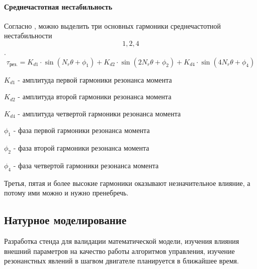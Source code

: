 
\paragraph{ Среднечастотная нестабильность }
Согласно \cite[ф-ла 5]{Novel_Modeling_and_Damping}, можно выделить три основных
гармоники среднечастотной нестабильности \[1, 2, 4\].
\begin{equation}
    \tau_{\text{рез.}} =   K_{d1} \cdot \sin{ (  N_{r} \theta + \phi_{1}) }
                         + K_{d2} \cdot \sin{ (2 N_{r} \theta + \phi_{2}) }
                         + K_{d4} \cdot \sin{ (4 N_{r} \theta + \phi_{4}) }
\end{equation}

$K_{d1}$ - амплитуда первой гармоники резонанса момента

$K_{d2}$ - амплитуда второй гармоники резонанса момента

$K_{d4}$ - амплитуда четвертой гармоники резонанса момента

$\phi_{1}$ - фаза первой гармоники резонанса момента

$\phi_{2}$ - фаза второй гармоники резонанса момента

$\phi_{4}$ - фаза четвертой гармоники резонанса момента

Третья, пятая и более высокие гармоники оказывают незначительное влияние, а потому
ими можно и нужно пренебречь.

\newpage
\subsection{Натурное моделирование}
Разработка стенда для валидации математической модели, изучения влияния внешний параметров
на качество работы алгоритмов управления, изучение резонанстных явлений в шагвом
двигателе планируется в ближайшее время.

